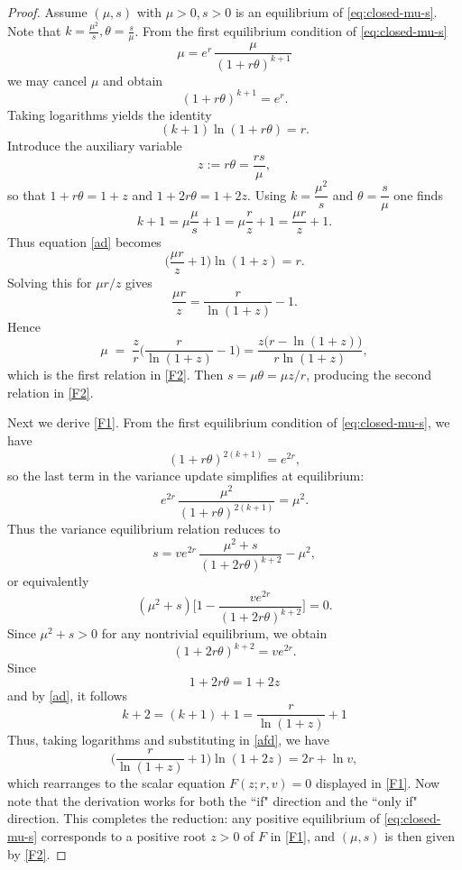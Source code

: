 \documentclass[10pt,a4paper]{amsart}
\begin{document}
\begin{proof}
Assume $(\mu, s)$ with \(\mu>0,s>0\) is an equilibrium of \eqref{eq:closed-mu-s}. Note that $k=\frac{\mu^2}{s}, \theta=\frac{s}{\mu}$. From the first equilibrium condition of \eqref{eq:closed-mu-s} 
\[
\mu = e^{r}\,\frac{\mu}{(1 + r\theta)^{k+1}}
\]
we may cancel \(\mu\) and obtain
\[
(1 + r\theta)^{k+1} = e^{r}.
\]
Taking logarithms yields the identity
\begin{equation}\label{ad}
(k+1)\ln(1+r\theta) = r. 
\end{equation}
Introduce the auxiliary variable
\[
z := r\theta = \frac{r s}{\mu},
\]
so that \(1+r\theta=1+z\) and \(1+2r\theta=1+2z\).  Using \(k=\dfrac{\mu^2}{s}\) and \(\theta=\dfrac{s}{\mu}\) one finds
\[
k+1 = \mu \frac{\mu}{s}+1 = \mu \frac{r}{z}+1= \frac{\mu r}{z}+1.
\]
Thus equation \eqref{ad} becomes
\[
\Big(\frac{\mu r}{z}+1\Big)\ln(1+z) = r.
\]
Solving this for \(\mu r/z\) gives
\[
\frac{\mu r}{z} = \frac{r}{\ln(1+z)} - 1.
\]
Hence
\[
\mu \;=\; \frac{z}{r}\Big(\frac{r}{\ln(1+z)} - 1\Big)
= \frac{z\big(r-\ln(1+z)\big)}{r\ln(1+z)},
\]
which is the first relation in \eqref{F2}. Then \(s=\mu\theta=\mu z/r\), producing the second relation in  \eqref{F2}.

Next we derive \eqref{F1}.  From the first equilibrium condition of \eqref{eq:closed-mu-s}, we have
\[
(1 + r\theta)^{2(k+1)} = e^{2r},
\]
so the last term in the variance update simplifies at equilibrium:
\[
e^{2r}\,\frac{\mu^2}{(1 + r\theta)^{2(k+1)}} = \mu^2.
\]
Thus the variance equilibrium relation reduces to
\[
s = v e^{2r}\,\frac{\mu^2+s}{(1+2r\theta)^{k+2}} - \mu^2,
\]
or equivalently
\[
(\mu^2+s)\Big[1 - \frac{v e^{2r}}{(1+2r\theta)^{k+2}}\Big] = 0.
\]
Since \(\mu^2+s>0\) for any nontrivial equilibrium, we obtain
\begin{equation}\label{afd}
(1+2r\theta)^{k+2} = v e^{2r}.
\end{equation}
Since  $$1+2r\theta=1+2z$$  and by \eqref{ad}, it follows  
$$k+2 = (k+1)+1 = \dfrac{r}{\ln(1+z)}+1$$
Thus, taking logarithms and substituting in \eqref{afd}, we have 
\[
\Big(\frac{r}{\ln(1+z)}+1\Big)\ln(1+2z) = 2r + \ln v,
\]
which rearranges to the scalar equation \(F(z;r,v)=0\) displayed in \eqref{F1}. Now note that the derivation works for both the ``if" direction and the ``only if" direction. This completes the reduction: any positive equilibrium of  \eqref{eq:closed-mu-s} corresponds to a positive root \(z>0\) of \(F\) in  \eqref{F1}, and \((\mu,s)\) is then given by \eqref{F2}.
\end{proof}
\end{document}
